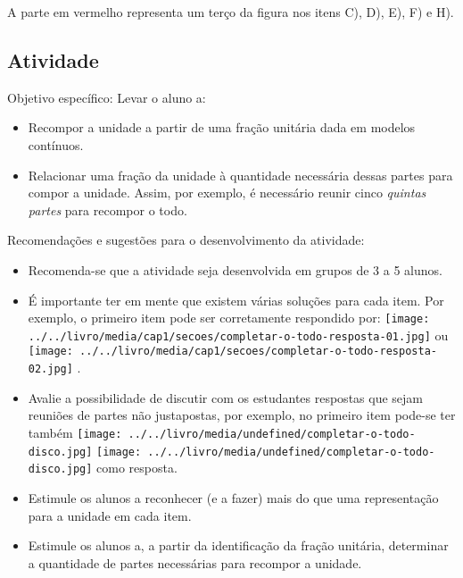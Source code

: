 \documentclass[a4paper,12pt,twoside]{book}
\begin{document}
\begin{resposta*}[breakable]{}{}  
  A parte em vermelho representa um terço da figura nos itens C), D), E), F) e H).   
\end{resposta*}





\subsection{Atividade}




\begin{professor*}[breakable]{}{}  
  Objetivo específico: Levar o aluno a:  
\begin{itemize} %
    \item       Recompor a unidade a partir de uma fração unitária dada em modelos contínuos. 
    \item       Relacionar uma fração da unidade à quantidade necessária dessas partes para compor a unidade. Assim, por exemplo, é necessário reunir cinco       {\it quintas partes}       para recompor o todo.
\end{itemize} %
  
        
  
  Recomendações e sugestões para o desenvolvimento da atividade:  
\begin{itemize} %
    \item       Recomenda-se que a atividade seja desenvolvida em grupos de 3 a 5 alunos.
    \item       É importante ter em mente que existem várias soluções para cada item. Por exemplo, o primeiro item pode ser corretamente respondido por:             \texttt{[image: ../../livro/media/cap1/secoes/completar-o-todo-resposta-01.jpg]}       ou             \texttt{[image: ../../livro/media/cap1/secoes/completar-o-todo-resposta-02.jpg]}      .
    \item       Avalie a possibilidade de discutir com os estudantes respostas que sejam reuniões de partes não justapostas, por exemplo, no primeiro item pode-se ter também             \texttt{[image: ../../livro/media/undefined/completar-o-todo-disco.jpg]}                   \texttt{[image: ../../livro/media/undefined/completar-o-todo-disco.jpg]}       como resposta.
    \item       Estimule os alunos a reconhecer (e a fazer) mais do que uma representação para a unidade em cada item.
    \item       Estimule os alunos a, a partir da identificação da fração unitária, determinar a quantidade de partes necessárias para recompor a unidade.
\end{itemize} %
  
\end{professor*}
\end{document}
